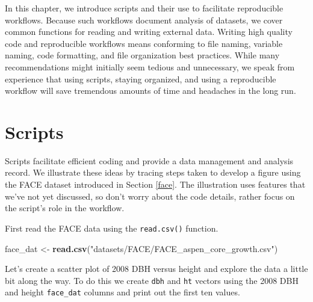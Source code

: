 \documentclass[
  11pt,
]{krantz}
\newenvironment{Shaded}{\begin{snugshade}}{\end{snugshade}}
\newcommand{\DecValTok}[1]{\textcolor[rgb]{0.00,0.00,0.81}{#1}}
\newcommand{\KeywordTok}[1]{\textcolor[rgb]{0.13,0.29,0.53}{\textbf{#1}}}
\newcommand{\NormalTok}[1]{#1}
\newcommand{\OperatorTok}[1]{\textcolor[rgb]{0.81,0.36,0.00}{\textbf{#1}}}
\newcommand{\StringTok}[1]{\textcolor[rgb]{0.31,0.60,0.02}{#1}}
\theoremstyle{definition}
\theoremstyle{definition}
\theoremstyle{definition}
\theoremstyle{definition}
\theoremstyle{remark}
\begin{document}
In this chapter, we introduce scripts and their use to facilitate reproducible workflows. Because such workflows document analysis of datasets, we cover common functions for reading and writing external data. Writing high quality code and reproducible workflows means conforming to file naming, variable naming, code formatting, and file organization best practices. While many recommendations might initially seem tedious and unnecessary, we speak from experience that using scripts, staying organized, and using a reproducible workflow will save tremendous amounts of time and headaches in the long run.

\hypertarget{scripts-1}{%
\section{Scripts}\label{scripts-1}}

Scripts facilitate efficient coding and provide a data management and analysis record. We illustrate these ideas by tracing steps taken to develop a figure using the FACE dataset introduced in Section \ref{face}. The illustration uses features that we've not yet discussed, so don't worry about the code details, rather focus on the script's role in the workflow.

First read the FACE data using the \texttt{read.csv()} function.

\begin{Shaded}
\begin{Highlighting}[]
\NormalTok{face\_dat \textless{}{-}}\StringTok{ }\KeywordTok{read.csv}\NormalTok{(}\StringTok{"datasets/FACE/FACE\_aspen\_core\_growth.csv"}\NormalTok{)}
\end{Highlighting}
\end{Shaded}

Let's create a scatter plot of 2008 DBH versus height and explore the data a little bit along the way. To do this we create \texttt{dbh} and \texttt{ht} vectors using the 2008 DBH and height \texttt{face\_dat} columns and print out the first ten values.

\begin{Shaded}
\end{Shaded}
\end{document}
